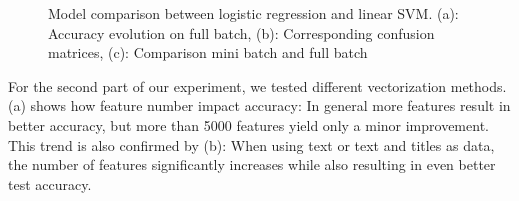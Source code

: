 \documentclass[10pt]{article}
\begin{document}
\begin{figure}[htbp]
\begin{subfigure}[t]{\textwidth}
	\end{subfigure}
	
	\caption{Model comparison between logistic regression and linear SVM. (a): Accuracy evolution on full batch, (b): Corresponding confusion matrices, (c): Comparison mini batch and full batch}
	\label{Fig 1}
\end{figure}

	For the second part of our experiment, we tested different vectorization methods. (a) shows how feature number impact accuracy: In general more features result in better accuracy, but more than 5000 features yield only a minor improvement. This trend is also confirmed by (b): When using text or text and titles as data, the number of features significantly increases while also resulting in even better test accuracy.\\
\end{document}
